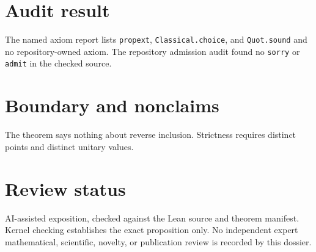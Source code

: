 \documentclass[11pt]{article}
\begin{document}
\section{Audit result}
The named axiom report lists \texttt{propext}, \texttt{Classical.choice}, and
\texttt{Quot.sound} and no repository-owned axiom.  The repository admission audit found no
\texttt{sorry} or \texttt{admit} in the checked source.

\section{Boundary and nonclaims}
The theorem says nothing about reverse inclusion.  Strictness requires distinct points and distinct unitary values.

\section{Review status}
AI-assisted exposition, checked against the Lean source and theorem manifest.  Kernel checking
establishes the exact proposition only.  No independent expert mathematical, scientific,
novelty, or publication review is recorded by this dossier.
\end{document}

